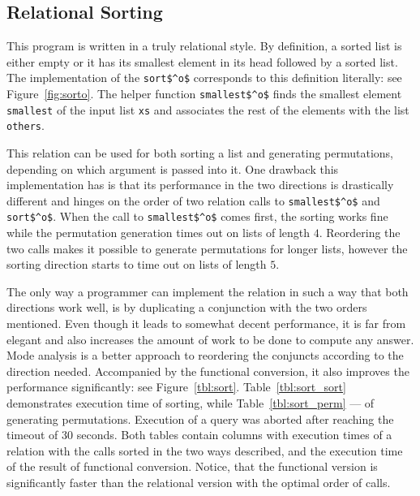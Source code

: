 \subsection{Relational Sorting}



This program is written in a truly relational style.
By definition, a sorted list is either empty or it has its smallest element in its head followed by a sorted list.
The implementation of the \lstinline{sort$^o$} corresponds to this definition literally: see Figure~\ref{fig:sorto}.
The helper function \lstinline{smallest$^o$} finds the smallest element \lstinline{smallest} of the input list \lstinline{xs} and associates the rest of the elements with the list \lstinline{others}.

This relation can be used for both sorting a list and generating permutations, depending on which argument is passed into it.
One drawback this implementation has is that its performance in the two directions is drastically different and hinges on the order of two relation calls to \lstinline{smallest$^o$} and \lstinline{sort$^o$}.
When the call to \lstinline{smallest$^o$} comes first, the sorting works fine while the permutation generation times out on lists of length $4$.
Reordering the two calls makes it possible to generate permutations for longer lists, however the sorting direction starts to time out on lists of length $5$.

The only way a programmer can implement the relation in such a way that both directions work well, is by duplicating a conjunction with the two orders mentioned.
Even though it leads to somewhat decent performance, it is far from elegant and also increases the amount of work to be done to compute any answer.
Mode analysis is a better approach to reordering the conjuncts according to the direction needed.
Accompanied by the functional conversion, it also improves the performance significantly: see Figure~\ref{tbl:sort}.
Table~\ref{tbl:sort_sort} demonstrates execution time of sorting, while Table~\ref{tbl:sort_perm} --- of generating permutations.
Execution of a query was aborted after reaching the timeout of 30 seconds.
Both tables contain columns with execution times of a relation with the calls sorted in the two ways described, and the execution time of the result of functional conversion.
Notice, that the functional version is significantly faster than the relational version with the optimal order of calls.



